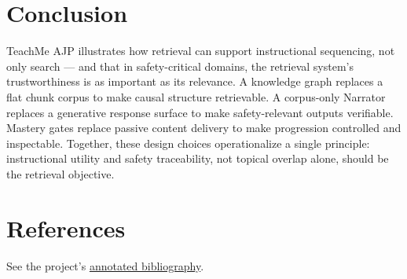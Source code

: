 \documentclass[10pt,letterpaper,twocolumn]{article}
\begin{document}
\section{Conclusion}
\label{sec:conclusion}

TeachMe AJP illustrates how retrieval can support instructional sequencing, not only search --- and that in safety-critical domains, the retrieval system's trustworthiness is as important as its relevance. A knowledge graph replaces a flat chunk corpus to make causal structure retrievable. A corpus-only Narrator replaces a generative response surface to make safety-relevant outputs verifiable. Mastery gates replace passive content delivery to make progression controlled and inspectable. Together, these design choices operationalize a single principle: instructional utility and safety traceability, not topical overlap alone, should be the retrieval objective.

\section{References}
\label{sec:references}

See the project's \href{https://github.com/wrgr/socratic-scenarios/blob/main/docs/references.md}{annotated bibliography}.
\end{document}
